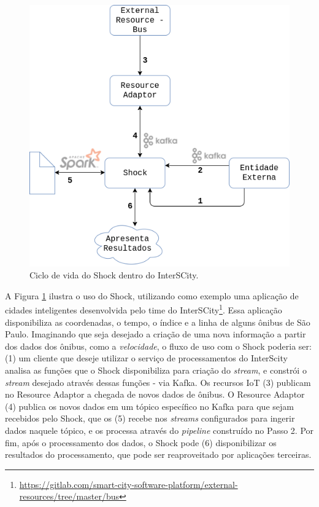 \begin{figure}
  \centering
    \includegraphics[scale=0.45]{figuras/shock.png}
    \caption{Ciclo de vida do Shock dentro do InterSCity.}
  \label{fig:shock}
\end{figure}

A Figura \ref{fig:shock} ilustra o uso do Shock, utilizando como exemplo uma
aplicação de cidades inteligentes desenvolvida pelo time do
InterSCity\footnote{\url{https://gitlab.com/smart-city-software-platform/external-resources/tree/master/bus}}.
Essa aplicação disponibiliza as coordenadas, o tempo, o índice e a linha de
alguns ônibus de São Paulo. Imaginando que seja desejado a criação de uma nova
informação a partir dos dados dos ônibus, como a \textit{velocidade}, o fluxo
de uso com o Shock poderia ser: (1) um cliente que deseje utilizar o serviço
de processamentos do InterScity analisa as funções que o Shock disponibiliza
para criação do \textit{stream}, e constrói o \textit{stream} desejado através
dessas funções - via Kafka. Os recursos IoT (3) publicam no Resource Adaptor a
chegada de novos dados de ônibus. O Resource Adaptor (4) publica os novos dados
em um tópico específico no Kafka para que sejam recebidos pelo Shock, que os (5)
recebe nos \textit{streams} configurados para ingerir dados naquele tópico, e
os processa através do \textit{pipeline} construído no Passo 2. Por fim, após o
processamento dos dados, o Shock pode (6) disponibilizar os resultados do
processamento, que pode ser reaproveitado por aplicações terceiras.

